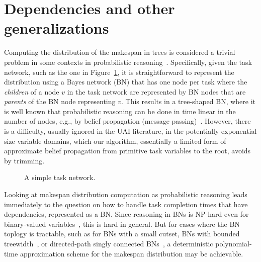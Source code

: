 \documentclass[review]{elsarticle}
\begin{document}
\section{Dependencies and other generalizations}\label{sec:generalizations}

Computing the distribution of the makespan in trees is considered a trivial problem in some contexts
in probabilistic reasoning~\cite{Pearl}.
Specifically, given the task network, such as the one in Figure~\ref{fig:task-network},
it is straightforward to represent the 
distribution using a Bayes network (BN) that has one node
per task where the {\em children} of a node $v$ in the 
task network are represented by BN nodes that are {\em parents} of
the BN node representing $v$. This results in a tree-shaped BN, 
where it is well known that probabilistic reasoning can be done in time linear
in the number of nodes, e.g., by belief propagation (message passing)~\cite{Pearl,Kim}. 
However, there is a difficulty, usually ignored in the UAI literature, in the potentially exponential size variable domains, which our algorithm, essentially a limited form
of approximate belief propagation from primitive task variables to the root, avoids by trimming.

\begin{figure}
\centering
{}
\caption{A simple task network.}
\label{fig:task-network}
\end{figure}

Looking at makespan distribution computation as probabilistic reasoning leads immediately to 
the question on how to handle task completion times that have dependencies, represented as a BN. 
Since reasoning in BNs is NP-hard even for binary-valued variables~\cite{Dagum.aij,Cooper.ai}, 
this is hard in general.
But for cases where the BN toplogy is tractable, such as for BNs 
with a small cutset,%
BNs with bounded treewidth~\cite{Bodlaender:2006:TCA:2092758.2092759},
or directed-path singly connected BNs~\cite{ShimonyDomshlak.aiRN2003},
a deterministic polynomial-time approximation scheme for 
the makespan distribution may be achievable.
\end{document}
